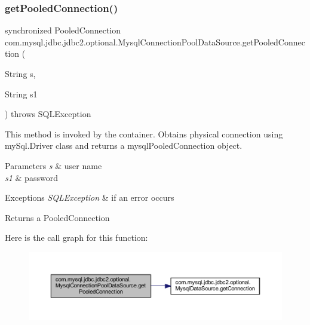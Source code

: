 \mbox{\label{classcom_1_1mysql_1_1jdbc_1_1jdbc2_1_1optional_1_1_mysql_connection_pool_data_source_a282b26c4bae068ad0d89a550924b3a2c}} 
\subsubsection{\texorpdfstring{get\+Pooled\+Connection()}{getPooledConnection()}\hspace{0.1cm}{\footnotesize\ttfamily [2/2]}}
{\footnotesize\ttfamily synchronized Pooled\+Connection com.\+mysql.\+jdbc.\+jdbc2.\+optional.\+Mysql\+Connection\+Pool\+Data\+Source.\+get\+Pooled\+Connection (\begin{DoxyParamCaption}\item[{String}]{s,  }\item[{String}]{s1 }\end{DoxyParamCaption}) throws S\+Q\+L\+Exception}

This method is invoked by the container. Obtains physical connection using my\+Sql.\+Driver class and returns a mysql\+Pooled\+Connection object.


\begin{DoxyParams}{Parameters}
{\em s} & user name \\
\hline
{\em s1} & password \\
\hline
\end{DoxyParams}

\begin{DoxyExceptions}{Exceptions}
{\em S\+Q\+L\+Exception} & if an error occurs \\
\hline
\end{DoxyExceptions}
\begin{DoxyReturn}{Returns}
a Pooled\+Connection 
\end{DoxyReturn}
Here is the call graph for this function\+:
\nopagebreak
\begin{figure}[H]
\begin{center}
\leavevmode
\includegraphics[width=350pt]{classcom_1_1mysql_1_1jdbc_1_1jdbc2_1_1optional_1_1_mysql_connection_pool_data_source_a282b26c4bae068ad0d89a550924b3a2c_cgraph}
\end{center}
\end{figure}


